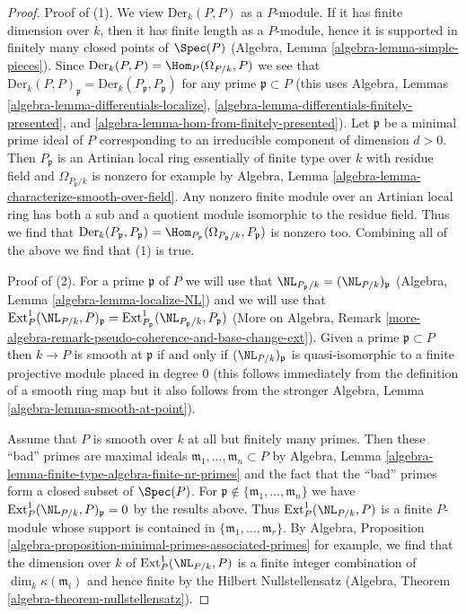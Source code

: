 \begin{proof}
Proof of (1). We view $\text{Der}_k(P, P)$ as a $P$-module.
If it has finite dimension over $k$, then it has finite length
as a $P$-module, hence it is supported in finitely many
closed points of $\Spec(P)$
(Algebra, Lemma \ref{algebra-lemma-simple-pieces}).
Since $\text{Der}_k(P, P) = \Hom_P(\Omega_{P/k}, P)$
we see that
$\text{Der}_k(P, P)_\mathfrak p = \text{Der}_k(P_\mathfrak p, P_\mathfrak p)$
for any prime $\mathfrak p \subset P$
(this uses Algebra, Lemmas
\ref{algebra-lemma-differentials-localize},
\ref{algebra-lemma-differentials-finitely-presented}, and
\ref{algebra-lemma-hom-from-finitely-presented}).
Let $\mathfrak p$ be a minimal prime ideal of $P$
corresponding to an irreducible component of dimension $d > 0$.
Then $P_\mathfrak p$ is an Artinian local ring
essentially of finite type over $k$ with residue field
and $\Omega_{P_\mathfrak p/k}$ is nonzero for example by
Algebra, Lemma \ref{algebra-lemma-characterize-smooth-over-field}.
Any nonzero finite module over an Artinian local ring
has both a sub and a quotient module isomorphic to the residue field.
Thus we find that
$\text{Der}_k(P_\mathfrak p, P_\mathfrak p) =
\Hom_{P_\mathfrak p}(\Omega_{P_\mathfrak p/k}, P_\mathfrak p)$
is nonzero too. Combining all of the above we find that (1) is true.

\medskip\noindent
Proof of (2). For a prime $\mathfrak p$ of $P$ we will use that
$\NL_{P_\mathfrak p/k} = (\NL_{P/k})_\mathfrak p$
(Algebra, Lemma \ref{algebra-lemma-localize-NL})
and we will
use that
$\text{Ext}_P^1(\NL_{P/k}, P)_\mathfrak p =
\text{Ext}_{P_\mathfrak p}^1(\NL_{P_\mathfrak p/k}, P_\mathfrak p)$
(More on Algebra, Remark
\ref{more-algebra-remark-pseudo-coherence-and-base-change-ext}).
Given a prime $\mathfrak p \subset P$
then $k \to P$ is smooth at $\mathfrak p$ if and only if
$(\NL_{P/k})_\mathfrak p$ is quasi-isomorphic
to a finite projective module placed in degree $0$ (this follows
immediately from the definition of a smooth ring map but it also
follows from the stronger Algebra, Lemma \ref{algebra-lemma-smooth-at-point}).

\medskip\noindent
Assume that $P$ is smooth over $k$ at all but finitely many primes.
Then these ``bad'' primes are maximal ideals
$\mathfrak m_1, \ldots, \mathfrak m_n \subset P$ by
Algebra, Lemma \ref{algebra-lemma-finite-type-algebra-finite-nr-primes}
and the fact that the ``bad'' primes form a closed subset of $\Spec(P)$.
For $\mathfrak p \not \in \{\mathfrak m_1, \ldots, \mathfrak m_n\}$
we have $\text{Ext}^1_P(\NL_{P/k}, P)_\mathfrak p = 0$ by the results above.
Thus $\text{Ext}^1_P(\NL_{P/k}, P)$ is a finite $P$-module
whose support is contained in $\{\mathfrak m_1, \ldots, \mathfrak m_r\}$.
By Algebra, Proposition
\ref{algebra-proposition-minimal-primes-associated-primes}
for example, we find that the dimension over $k$ of
$\text{Ext}^1_P(\NL_{P/k}, P)$ is a finite integer combination
of $\dim_k \kappa(\mathfrak m_i)$ and hence finite by
the Hilbert Nullstellensatz
(Algebra, Theorem \ref{algebra-theorem-nullstellensatz}).
\end{proof}


